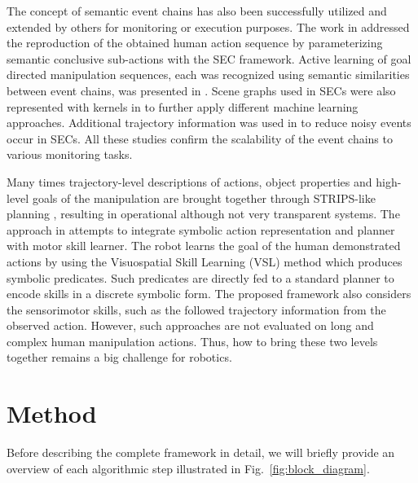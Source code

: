   

The concept of semantic event chains has also  been successfully utilized and extended by others \cite{Waechter2013,Luo2011,Vuga2014,David2014} for monitoring or execution purposes. The work in \cite{Waechter2013} addressed the reproduction of the obtained human action sequence by parameterizing semantic conclusive sub-actions with the SEC framework.
Active learning of goal directed manipulation sequences, each was recognized using semantic similarities between event chains, was presented in \cite{David2014}. Scene graphs used in SECs were also represented with kernels in \cite{Luo2011} to further apply different machine learning approaches. Additional trajectory information was used in \cite{Vuga2014} to reduce noisy events occur in SECs. All these studies confirm the scalability of the event chains to various monitoring tasks.

Many times trajectory-level descriptions of actions, object properties and high-level goals of the manipulation are brought together through STRIPS-like planning \cite{Dillmann2010}, resulting in operational although not very transparent systems. The approach in \cite{Ahmadzadeh2015} attempts to integrate symbolic action 
representation and planner with motor skill learner. The robot learns the goal of the human demonstrated actions by using
the Visuospatial Skill Learning (VSL) method which produces symbolic predicates. Such predicates are directly fed to a standard planner to encode skills in a discrete symbolic form. The proposed framework also considers the sensorimotor skills, such as the followed trajectory information from
the observed action. However, such approaches are not evaluated on long and complex human manipulation actions. 
Thus, how to bring these two levels together remains a big challenge for robotics.




 






\clearpage  %

\section{Method}
\label{sec:method}

Before describing the complete framework in detail, we will briefly provide an overview of each algorithmic step illustrated in Fig.~\ref{fig:block_diagram}.
  
